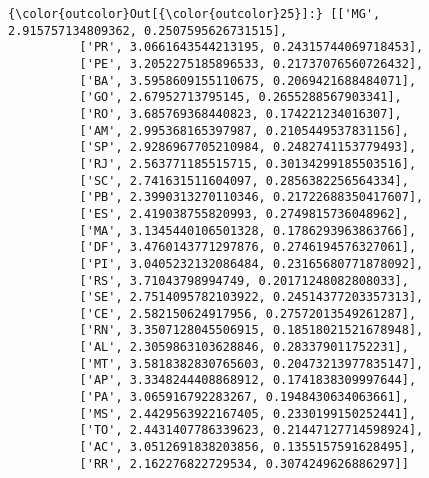 \documentclass[11pt]{article}
\begin{document}
\begin{Verbatim}[commandchars=\\\{\}]
{\color{outcolor}Out[{\color{outcolor}25}]:} [['MG', 2.915757134809362, 0.2507595626731515],
          ['PR', 3.0661643544213195, 0.24315744069718453],
          ['PE', 3.2052275185896533, 0.21737076560726432],
          ['BA', 3.5958609155110675, 0.2069421688484071],
          ['GO', 2.67952713795145, 0.2655288567903341],
          ['RO', 3.685769368440823, 0.174221234016307],
          ['AM', 2.995368165397987, 0.2105449537831156],
          ['SP', 2.9286967705210984, 0.2482741153779493],
          ['RJ', 2.563771185515715, 0.30134299185503516],
          ['SC', 2.741631511604097, 0.2856382256564334],
          ['PB', 2.3990313270110346, 0.21722688350417607],
          ['ES', 2.419038755820993, 0.2749815736048962],
          ['MA', 3.1345440106501328, 0.1786293963863766],
          ['DF', 3.4760143771297876, 0.2746194576327061],
          ['PI', 3.0405232132086484, 0.23165680771878092],
          ['RS', 3.71043798994749, 0.20171248082808033],
          ['SE', 2.7514095782103922, 0.24514377203357313],
          ['CE', 2.582150624917956, 0.27572013549261287],
          ['RN', 3.3507128045506915, 0.18518021521678948],
          ['AL', 2.3059863103628846, 0.283379011752231],
          ['MT', 3.5818382830765603, 0.20473213977835147],
          ['AP', 3.3348244408868912, 0.1741838309997644],
          ['PA', 3.065916792283267, 0.1948430634063661],
          ['MS', 2.4429563922167405, 0.2330199150252441],
          ['TO', 2.4431407786339623, 0.21447127714598924],
          ['AC', 3.0512691838203856, 0.1355157591628495],
          ['RR', 2.162276822729534, 0.3074249626886297]]
\end{Verbatim}
            
\end{document}
